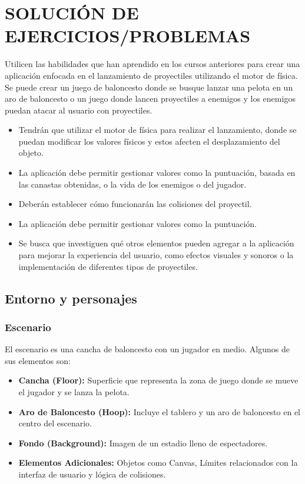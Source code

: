 \section{SOLUCIÓN DE EJERCICIOS/PROBLEMAS}

Utilicen las habilidades que han aprendido en los cursos anteriores para crear una aplicación enfocada en el lanzamiento de proyectiles utilizando el motor de física. Se puede crear un juego de baloncesto donde se busque lanzar una pelota en un aro de baloncesto o un juego donde lancen proyectiles a enemigos y los enemigos puedan atacar al usuario con proyectiles.

\begin{itemize}
    \item Tendrán que utilizar el motor de física para realizar el lanzamiento, donde se puedan modificar los valores físicos y estos afecten el desplazamiento del objeto.
    \item La aplicación debe permitir gestionar valores como la puntuación, basada en las canastas obtenidas, o la vida de los enemigos o del jugador.
    \item Deberán establecer cómo funcionarán las colisiones del proyectil.
    \item La aplicación debe permitir gestionar valores como la puntuación.
    \item Se busca que investiguen qué otros elementos pueden agregar a la aplicación para mejorar la experiencia del usuario, como efectos visuales y sonoros o la implementación de diferentes tipos de proyectiles.
\end{itemize}

\subsection{Entorno y personajes}

\subsubsection{Escenario}
El escenario es una cancha de baloncesto con un jugador en medio. Algunos de sus elementos son:

\begin{itemize}
    \item \textbf{Cancha (Floor):} Superficie que representa la zona de juego donde se mueve el jugador y se lanza la pelota.
    \item \textbf{Aro de Baloncesto (Hoop):} Incluye el tablero y un aro de baloncesto en el centro del escenario.
    \item \textbf{Fondo (Background):} Imagen de un estadio lleno de espectadores.
    \item \textbf{Elementos Adicionales:} Objetos como Canvas, Límites relacionados con la interfaz de usuario y lógica de colisiones.
\end{itemize}

